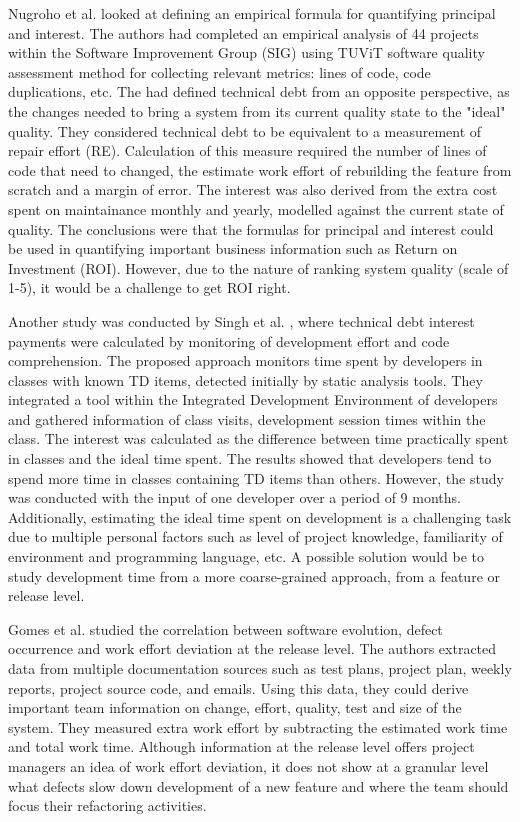 \documentclass{mprop}
\begin{document}
Nugroho et al. \cite{Nugroho2011} looked at defining an empirical formula for
quantifying principal and interest. The authors had completed an empirical
analysis of 44 projects within the Software Improvement Group (SIG) using TUViT
software quality assessment method for collecting relevant metrics: lines of
code, code duplications, etc. The had defined technical debt from an opposite
perspective, as the changes needed to bring a system from its current quality
state to the "ideal" quality. They considered technical debt to be equivalent to
a measurement of repair effort (RE). Calculation of this measure required the
number of lines of code that need to changed, the estimate work effort of
rebuilding the feature from scratch and a margin of error. The interest was also
derived from the extra cost spent on maintainance monthly and yearly, modelled
against the current state of quality. The conclusions were that the formulas for
principal and interest could be used in quantifying important business
information such as Return on Investment (ROI). However, due to the nature of
ranking system quality (scale of 1-5), it would be a challenge to get ROI right.


Another study was conducted by Singh et al. \cite{Singh2014}, where technical
debt interest payments were calculated by monitoring of development effort and
code comprehension. The proposed approach monitors time spent by developers in
classes with known TD items, detected initially by static analysis tools. They
integrated a tool within the Integrated Development Environment of developers
and gathered information of class visits, development session times within the
class. The interest was calculated as the difference between time practically
spent in classes and the ideal time spent. The results showed that developers
tend to spend more time in classes containing TD items than others. However, the
study was conducted with the input of one developer over a period of 9 months.
Additionally, estimating the ideal time spent on development is a challenging
task due to multiple personal factors such as level of project knowledge,
familiarity of environment and programming language, etc. A possible solution
would be to study development time from a more coarse-grained approach, from a
feature or release level.

Gomes et al. \cite{Gomes2011} studied the correlation between software
evolution, defect occurrence and work effort deviation at the release level. The
authors extracted data from multiple documentation sources such as test plans,
project plan, weekly reports, project source code, and emails. Using this data,
they could derive important team information on change, effort, quality, test
and size of the system. They measured extra work effort by subtracting the
estimated work time and total work time. Although information at the release
level offers project managers an idea of work effort deviation, it does not show
at a granular level what defects slow down development of a new feature and
where the team should focus their refactoring activities.
\end{document}
